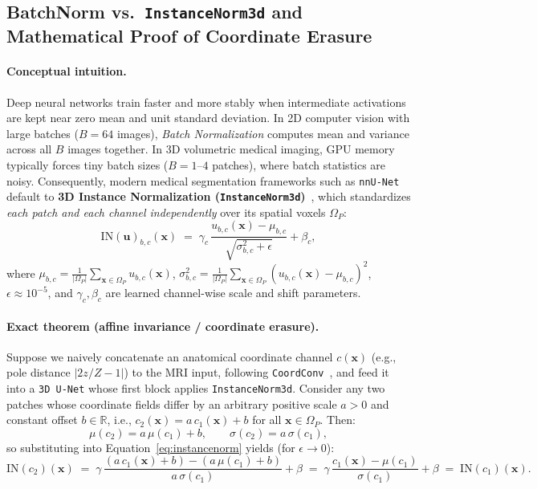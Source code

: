 \documentclass[10pt,a4paper]{article}
\renewcommand{\_}{\origunderscore\allowbreak}
\begin{document}
\subsection{BatchNorm vs.\ \texttt{InstanceNorm3d} and Mathematical Proof of Coordinate Erasure}
\label{app:inorm_proof}

\paragraph{Conceptual intuition.} Deep neural networks train faster and more stably when intermediate activations are kept near zero mean and unit standard deviation. In 2D computer vision with large batches ($B = 64$ images), \emph{Batch Normalization} computes mean and variance across all $B$ images together. In 3D volumetric medical imaging, GPU memory typically forces tiny batch sizes ($B = 1\text{--}4$ patches), where batch statistics are noisy. Consequently, modern medical segmentation frameworks such as \texttt{nnU-Net}~\cite{isensee2021nnunet} default to \textbf{3D Instance Normalization (\texttt{InstanceNorm3d})}~\cite{ulyanov2016instancenorm}, which standardizes \emph{each patch and each channel independently} over its spatial voxels $\Omega_P$:
\begin{equation}
    \text{IN}(\mathbf{u})_{b,c}(\mathbf{x}) \;=\; \gamma_c \,\frac{u_{b,c}(\mathbf{x}) - \mu_{b,c}}{\sqrt{\sigma_{b,c}^2 + \epsilon}} + \beta_c,
    \label{eq:instancenorm}
\end{equation}
where $\mu_{b,c} = \frac{1}{|\Omega_P|}\sum_{\mathbf{x}\in\Omega_P} u_{b,c}(\mathbf{x})$, $\sigma_{b,c}^2 = \frac{1}{|\Omega_P|}\sum_{\mathbf{x}\in\Omega_P}(u_{b,c}(\mathbf{x}) - \mu_{b,c})^2$, $\epsilon \approx 10^{-5}$, and $\gamma_c, \beta_c$ are learned channel-wise scale and shift parameters.

\paragraph{Exact theorem (affine invariance / coordinate erasure).} Suppose we naively concatenate an anatomical coordinate channel $c(\mathbf{x})$ (e.g., pole distance $|2z/Z - 1|$) to the MRI input, following \texttt{CoordConv}~\cite{liu2018coordconv}, and feed it into a \texttt{3D U-Net} whose first block applies \texttt{InstanceNorm3d}. Consider any two patches whose coordinate fields differ by an arbitrary positive scale $a > 0$ and constant offset $b \in \mathbb{R}$, i.e., $c_2(\mathbf{x}) = a\,c_1(\mathbf{x}) + b$ for all $\mathbf{x} \in \Omega_P$. Then:
\begin{equation}
    \mu(c_2) = a\,\mu(c_1) + b, \qquad \sigma(c_2) = a\,\sigma(c_1),
\end{equation}
so substituting into Equation~\eqref{eq:instancenorm} yields (for $\epsilon \to 0$):
\begin{equation}
    \text{IN}(c_2)(\mathbf{x}) \;=\; \gamma\,\frac{(a\,c_1(\mathbf{x}) + b) - (a\,\mu(c_1) + b)}{a\,\sigma(c_1)} + \beta \;=\; \gamma\,\frac{c_1(\mathbf{x}) - \mu(c_1)}{\sigma(c_1)} + \beta \;=\; \text{IN}(c_1)(\mathbf{x}).
    \label{eq:inorm_erasure}
\end{equation}
\end{document}
